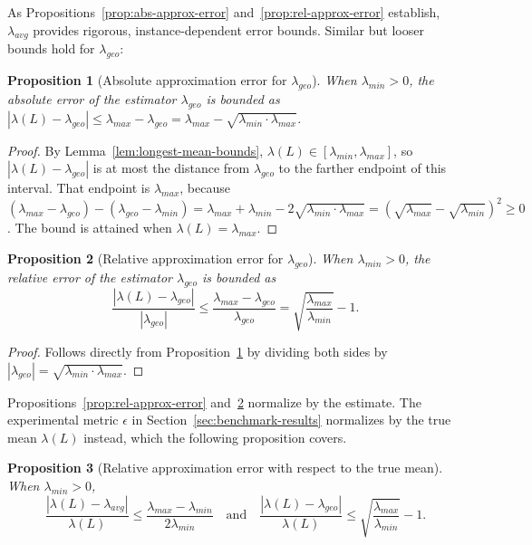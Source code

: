 \documentclass{article}
\newtheorem{prop}{Proposition}[section]
\theoremstyle{definition}
\begin{document}
As Propositions~\ref{prop:abs-approx-error}
and~\ref{prop:rel-approx-error} establish, $\lambda_{avg}$ provides
rigorous, instance-dependent error bounds. Similar but looser bounds
hold for $\lambda_{geo}$:

\begin{prop}[Absolute approximation error for $\lambda_{geo}$]
  \label{prop:abs-approx-error-geo}
When $\lambda_{min} > 0$, the absolute error of the estimator
$\lambda_{geo}$ is bounded as $|\lambda(L) - \lambda_{geo}| \leq
\lambda_{max} - \lambda_{geo} = \lambda_{max} - \sqrt{\lambda_{min}
  \cdot \lambda_{max}}$.
\end{prop}

\begin{proof}
By Lemma~\ref{lem:longest-mean-bounds}, $\lambda(L) \in
[\lambda_{min}, \lambda_{max}]$, so $|\lambda(L) - \lambda_{geo}|$ is
at most the distance from $\lambda_{geo}$ to the farther endpoint of
this interval. That endpoint is $\lambda_{max}$, because
$(\lambda_{max} - \lambda_{geo}) - (\lambda_{geo} - \lambda_{min}) =
\lambda_{max} + \lambda_{min} - 2\sqrt{\lambda_{min} \cdot
  \lambda_{max}} = (\sqrt{\lambda_{max}} - \sqrt{\lambda_{min}})^2
\geq 0$. The bound is attained when $\lambda(L) = \lambda_{max}$.
\end{proof}

\begin{prop}[Relative approximation error for $\lambda_{geo}$]
  \label{prop:rel-approx-error-geo}
When $\lambda_{min} > 0$, the relative error of the estimator
$\lambda_{geo}$ is bounded as
\begin{equation}
\frac{|\lambda(L) - \lambda_{geo}|}{|\lambda_{geo}|} \leq
\frac{\lambda_{max} - \lambda_{geo}}{\lambda_{geo}} =
\sqrt{\frac{\lambda_{max}}{\lambda_{min}}} - 1.
\end{equation}
\end{prop}

\begin{proof}
Follows directly from Proposition~\ref{prop:abs-approx-error-geo} by
dividing both sides by $|\lambda_{geo}| = \sqrt{\lambda_{min} \cdot
  \lambda_{max}}$.
\end{proof}

Propositions~\ref{prop:rel-approx-error}
and~\ref{prop:rel-approx-error-geo} normalize by the estimate. The
experimental metric $\epsilon$ in
Section~\ref{sec:benchmark-results} normalizes by the true mean
$\lambda(L)$ instead, which the following proposition covers.

\begin{prop}[Relative approximation error with respect to the true mean]
\label{prop:rel-approx-error-true}
When $\lambda_{min} > 0$,
\begin{equation}
\frac{|\lambda(L) - \lambda_{avg}|}{\lambda(L)} \leq
\frac{\lambda_{max} - \lambda_{min}}{2\lambda_{min}}
\quad \text{and} \quad
\frac{|\lambda(L) - \lambda_{geo}|}{\lambda(L)} \leq
\sqrt{\frac{\lambda_{max}}{\lambda_{min}}} - 1.
\end{equation}
\end{prop}
\end{document}
